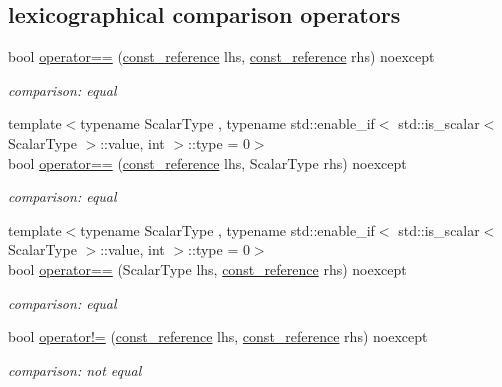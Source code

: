 \subsection*{lexicographical comparison operators}
\begin{DoxyCompactItemize}
\item 
bool \hyperlink{classnlohmann_1_1basic__json_a122640e7e2db1814fc7bbb3c122ec76e}{operator==} (\hyperlink{classnlohmann_1_1basic__json_ab8a1c33ee7b154fc41ca2545aa9724e6}{const\+\_\+reference} lhs, \hyperlink{classnlohmann_1_1basic__json_ab8a1c33ee7b154fc41ca2545aa9724e6}{const\+\_\+reference} rhs) noexcept
\begin{DoxyCompactList}\small\item\em comparison\+: equal \end{DoxyCompactList}\item 
{\footnotesize template$<$typename Scalar\+Type , typename std\+::enable\+\_\+if$<$ std\+::is\+\_\+scalar$<$ Scalar\+Type $>$\+::value, int $>$\+::type  = 0$>$ }\\bool \hyperlink{classnlohmann_1_1basic__json_a107a085c92ec4e062d1185b2d09c7978}{operator==} (\hyperlink{classnlohmann_1_1basic__json_ab8a1c33ee7b154fc41ca2545aa9724e6}{const\+\_\+reference} lhs, Scalar\+Type rhs) noexcept
\begin{DoxyCompactList}\small\item\em comparison\+: equal \end{DoxyCompactList}\item 
{\footnotesize template$<$typename Scalar\+Type , typename std\+::enable\+\_\+if$<$ std\+::is\+\_\+scalar$<$ Scalar\+Type $>$\+::value, int $>$\+::type  = 0$>$ }\\bool \hyperlink{classnlohmann_1_1basic__json_a24ae7acd5b06ae49cfe1c94633436b68}{operator==} (Scalar\+Type lhs, \hyperlink{classnlohmann_1_1basic__json_ab8a1c33ee7b154fc41ca2545aa9724e6}{const\+\_\+reference} rhs) noexcept
\begin{DoxyCompactList}\small\item\em comparison\+: equal \end{DoxyCompactList}\item 
bool \hyperlink{classnlohmann_1_1basic__json_a6e2e21da48f5d9471716cd868a068327}{operator!=} (\hyperlink{classnlohmann_1_1basic__json_ab8a1c33ee7b154fc41ca2545aa9724e6}{const\+\_\+reference} lhs, \hyperlink{classnlohmann_1_1basic__json_ab8a1c33ee7b154fc41ca2545aa9724e6}{const\+\_\+reference} rhs) noexcept
\begin{DoxyCompactList}\small\item\em comparison\+: not equal \end{DoxyCompactList}\item 

\end{DoxyCompactItemize}
